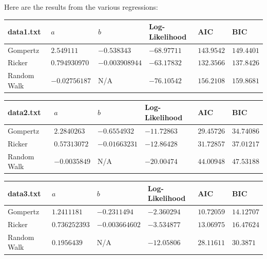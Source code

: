 \documentclass{article} %
\theoremstyle{plain}
\numberwithin{equation}{section} %
\numberwithin{figure}{section} %
\numberwithin{table}{section} %
\begin{document}
Here are the results from the various regressions:

\begin{table}[ht!]
    \begin{tabular}{||l||l|l|l|l|l||}\hline\hline
        data1.txt   & $a$ & $b$ & Log-Likelihood & AIC & BIC \\\hline\hline
        Gompertz    & $2.549111$ & $-0.538343$ & $-68.97711$ & $143.9542$ & $149.4401$ \\\hline
        Ricker      & $0.794930970$ & $-0.003908944$ & $-63.17832$ & $132.3566$ & $137.8426$ \\\hline
        Random Walk & $-0.02756187$ & N/A & $-76.10542$ & $156.2108$ & $159.8681$ \\\hline\hline
    \end{tabular}
\end{table}

\begin{table}[ht!]
    \begin{tabular}{||l||l|l|l|l|l||}\hline\hline
        data2.txt   & $a$ & $b$ & Log-Likelihood & AIC & BIC \\\hline\hline
        Gompertz    & $2.2840263$ & $-0.6554932$ & $-11.72863$ & $29.45726$ & $34.74086$ \\\hline
        Ricker      & $0.57313072$ & $-0.01663231$ & $-12.86428$ & $31.72857$ & $37.01217$ \\\hline
        Random Walk & $-0.0035849$ & N/A & $-20.00474$ & $44.00948$ & $47.53188$ \\\hline\hline
    \end{tabular}
\end{table}

\begin{table}[ht!]
    \begin{tabular}{||l||l|l|l|l|l||}\hline\hline
        data3.txt   & $a$ & $b$ & Log-Likelihood & AIC & BIC \\\hline\hline
        Gompertz    & $1.2411181$ & $-0.2311494$ & $-2.360294$ & $10.72059$ & $14.12707$ \\\hline
        Ricker      & $0.736252393$ & $-0.003664602$ & $-3.534877$ & $13.06975$ & $16.47624$ \\\hline
        Random Walk & $0.1956439$ & N/A & $-12.05806$ & $28.11611$ & $30.3871$ \\\hline\hline
    \end{tabular}
\end{table}
\end{document}
